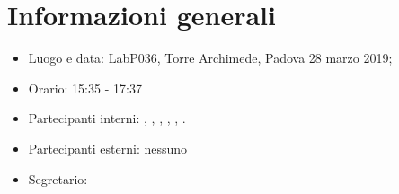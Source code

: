 \section{Informazioni generali}
\begin{itemize}
    \item Luogo e data: LabP036, Torre Archimede, Padova 28 marzo 2019;
    \item Orario: 15:35 - 17:37
    \item Partecipanti interni: \valentin{}, \francesco{}, \daniele{}, \singh{}, \davide{}, \andrea{}.
    \item Partecipanti esterni: nessuno
    \item Segretario: \valentin{}
\end{itemize}